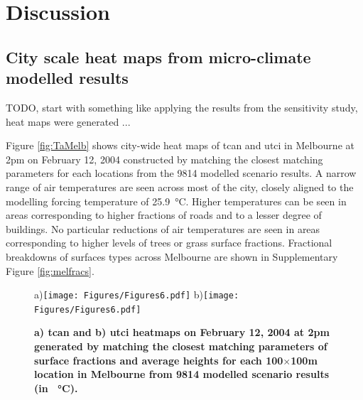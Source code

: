 \documentclass[final,3p,times,authoryear]{elsarticle}
\begin{document}
 





\section{Discussion}\label{sec:discussion}







\subsection{City scale heat maps from micro-climate modelled results}\label{sec:resultsheatmaps}




TODO, start with something like applying the results from the sensitivity study, heat maps were generated ... 

Figure \ref{fig:TaMelb} shows city-wide heat maps of \gls{tcan} and \gls{utci} in Melbourne at 2pm on February 12, 2004 constructed by matching the closest matching parameters for each locations from the 9814 modelled scenario results. A narrow range of air temperatures are seen across most of the city, closely aligned to the modelling forcing temperature of 25.9\SI{}{\degreeCelsius}. Higher temperatures can be seen in areas corresponding to higher fractions of roads and to a lesser degree of buildings. No particular reductions of air temperatures are seen in areas corresponding to higher levels of trees or grass surface fractions. Fractional breakdowns of surfaces types across Melbourne are shown in Supplementary Figure \ref{fig:melfracs}. 


\begin{figure}
\centering
a)\texttt{[image: Figures/Figures6.pdf]}
b)\texttt{[image: Figures/Figures6.pdf]}
\caption{\bf a) \gls{tcan} and b) \gls{utci} heatmaps on February 12, 2004 at 2pm generated by matching the closest matching parameters of surface fractions and average heights for each 100$\times$100m location in Melbourne from 9814 modelled scenario results (in \SI{}{\degreeCelsius}). }
 \label{fig:TaMelb}  \label{fig:utciMelb}
\end{figure}
\end{document}
